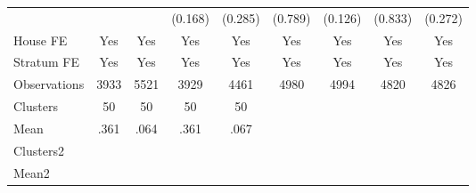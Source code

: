{\begin{tabular}{l*{8}{c}}
                &                  &                  &  (0.168)         &  (0.285)         &  (0.789)         &  (0.126)         &  (0.833)         &  (0.272)         \\
House FE        &      Yes         &      Yes         &      Yes         &      Yes         &      Yes         &      Yes         &      Yes         &      Yes         \\
Stratum FE      &      Yes         &      Yes         &      Yes         &      Yes         &      Yes         &      Yes         &      Yes         &      Yes         \\
\midrule
Observations    &     3933         &     5521         &     3929         &     4461         &     4980         &     4994         &     4820         &     4826         \\
Clusters        &       50         &       50         &       50         &       50         &                  &                  &                  &                  \\
Mean            &     .361         &     .064         &     .361         &     .067         &                  &                  &                  &                  \\
Clusters2       &                  &                  &                  &                  &                  &                  &                  &                  \\
Mean2           &                  &                  &                  &                  &                  &                  &                  &                  \\
\bottomrule
\end{tabular}
}
